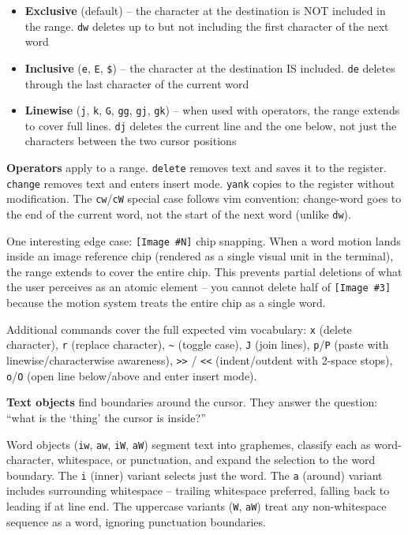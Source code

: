 \documentclass[
  english,
  11pt,
  letterpaper,
]{book}
\providecommand{\tightlist}{%
  \setlength{\itemsep}{0pt}\setlength{\parskip}{0pt}}
\begin{document}
\begin{itemize}
\tightlist
\item
  \textbf{Exclusive} (default) -- the character at the destination is
  NOT included in the range. \texttt{dw} deletes up to but not including
  the first character of the next word
\item
  \textbf{Inclusive} (\texttt{e}, \texttt{E}, \texttt{\$}) -- the
  character at the destination IS included. \texttt{de} deletes through
  the last character of the current word
\item
  \textbf{Linewise} (\texttt{j}, \texttt{k}, \texttt{G}, \texttt{gg},
  \texttt{gj}, \texttt{gk}) -- when used with operators, the range
  extends to cover full lines. \texttt{dj} deletes the current line and
  the one below, not just the characters between the two cursor
  positions
\end{itemize}

\textbf{Operators} apply to a range. \texttt{delete} removes text and
saves it to the register. \texttt{change} removes text and enters insert
mode. \texttt{yank} copies to the register without modification. The
\texttt{cw}/\texttt{cW} special case follows vim convention: change-word
goes to the end of the current word, not the start of the next word
(unlike \texttt{dw}).

One interesting edge case: \texttt{{[}Image\ \#N{]}} chip snapping. When
a word motion lands inside an image reference chip (rendered as a single
visual unit in the terminal), the range extends to cover the entire
chip. This prevents partial deletions of what the user perceives as an
atomic element -- you cannot delete half of \texttt{{[}Image\ \#3{]}}
because the motion system treats the entire chip as a single word.

Additional commands cover the full expected vim vocabulary: \texttt{x}
(delete character), \texttt{r} (replace character),
\texttt{\textasciitilde{}} (toggle case), \texttt{J} (join lines),
\texttt{p}/\texttt{P} (paste with linewise/characterwise awareness),
\texttt{\textgreater{}\textgreater{}} / \texttt{\textless{}\textless{}}
(indent/outdent with 2-space stops), \texttt{o}/\texttt{O} (open line
below/above and enter insert mode).

\textbf{Text objects} find boundaries around the cursor. They answer the
question: ``what is the `thing' the cursor is inside?''

Word objects (\texttt{iw}, \texttt{aw}, \texttt{iW}, \texttt{aW})
segment text into graphemes, classify each as word-character,
whitespace, or punctuation, and expand the selection to the word
boundary. The \texttt{i} (inner) variant selects just the word. The
\texttt{a} (around) variant includes surrounding whitespace -- trailing
whitespace preferred, falling back to leading if at line end. The
uppercase variants (\texttt{W}, \texttt{aW}) treat any non-whitespace
sequence as a word, ignoring punctuation boundaries.
\end{document}
